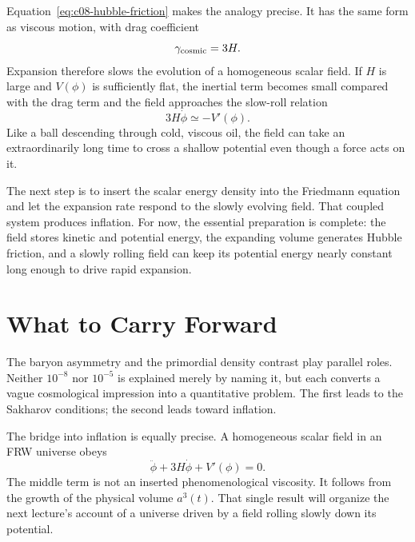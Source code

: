 Equation~\eqref{eq:c08-hubble-friction} makes the analogy precise. It has the same form as viscous motion, with drag coefficient
\begin{equation}
\gamma_{\rm cosmic}=3H.
\end{equation}
Expansion therefore slows the evolution of a homogeneous scalar field. If \(H\) is large and \(V(\phi)\) is sufficiently flat, the inertial term becomes small compared with the drag term and the field approaches the slow-roll relation
\begin{equation}
3H\dot\phi\simeq-V'(\phi).
\end{equation}
Like a ball descending through cold, viscous oil, the field can take an extraordinarily long time to cross a shallow potential even though a force acts on it.

The next step is to insert the scalar energy density into the Friedmann equation and let the expansion rate respond to the slowly evolving field. That coupled system produces inflation. For now, the essential preparation is complete: the field stores kinetic and potential energy, the expanding volume generates Hubble friction, and a slowly rolling field can keep its potential energy nearly constant long enough to drive rapid expansion.

\section{What to Carry Forward}

The baryon asymmetry and the primordial density contrast play parallel roles. Neither \(10^{-8}\) nor \(10^{-5}\) is explained merely by naming it, but each converts a vague cosmological impression into a quantitative problem. The first leads to the Sakharov conditions; the second leads toward inflation.

The bridge into inflation is equally precise. A homogeneous scalar field in an FRW universe obeys
\[
\ddot\phi+3H\dot\phi+V'(\phi)=0.
\]
The middle term is not an inserted phenomenological viscosity. It follows from the growth of the physical volume \(a^3(t)\). That single result will organize the next lecture's account of a universe driven by a field rolling slowly down its potential.
